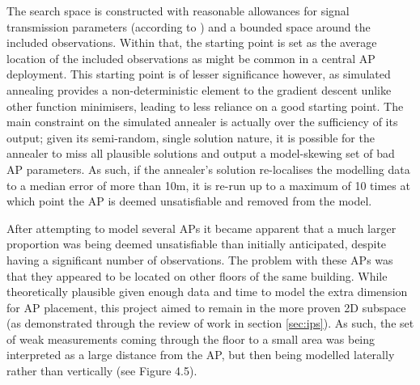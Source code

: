 \documentclass{UoYCSproject}
\begin{document}
                The search space is constructed with reasonable allowances for signal transmission parameters (according to \citet{chintalapudi2010indoor}) and a bounded space around the included observations. Within that, the starting point is set as the average location of the included observations as might be common in a central AP deployment. This starting point is of lesser significance however, as simulated annealing provides a non-deterministic element to the gradient descent unlike other function minimisers, leading to less reliance on a good starting point. The main constraint on the simulated annealer is actually over the sufficiency of its output; given its semi-random, single solution nature, it is possible for the annealer to miss all plausible solutions and output a model-skewing set of bad AP parameters. As such, if the annealer's solution re-localises the modelling data to a median error of more than 10m, it is re-run up to a maximum of 10 times at which point the AP is deemed unsatisfiable and removed from the model.
                
                After attempting to model several APs it became apparent that a much larger proportion was being deemed unsatisfiable than initially anticipated, despite having a significant number of observations. The problem with these APs was that they appeared to be located on other floors of the same building. While theoretically plausible given enough data and time to model the extra dimension for AP placement, this project aimed to remain in the more proven 2D subspace (as demonstrated through the review of work in section \ref{sec:ips}). As such, the set of weak measurements coming through the floor to a small area was being interpreted as a large distance from the AP, but then being modelled laterally rather than vertically (see Figure 4.5).
                
\end{document}
